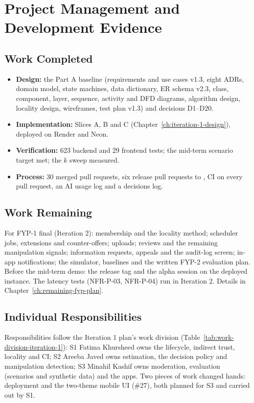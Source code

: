 \chapter{Project Management and Development Evidence}\label{ch:project-management-development}
\section{Work Completed}\label{sec:work-completed}
\begin{itemize}
\item \textbf{Design:} the Part A baseline (requirements and use cases v1.3, eight ADRs, domain model, state machines, data dictionary, ER schema v2.3, class, component, layer, sequence, activity and DFD diagrams, algorithm design, locality design, wireframes, test plan v1.3) and decisions D1--D20.
\item \textbf{Implementation:} Slices A, B and C (Chapter~\ref{ch:iteration-1-design}), deployed on Render and Neon.
\item \textbf{Verification:} 623 backend and 29 frontend tests; the mid-term scenario target met; the $k$ sweep measured.
\item \textbf{Process:} 30 merged pull requests, six release pull requests to , CI on every pull request, an AI usage log and a decisions log.
\end{itemize}

\section{Work Remaining}\label{sec:work-remaining}
For FYP-1 final (Iteration 2): membership and the locality method; scheduler jobs, extensions and counter-offers; uploads; reviews and the remaining manipulation signals; information requests, appeals and the audit-log screen; in-app notifications; the simulator, baselines and the written FYP-2 evaluation plan. Before the mid-term demo: the release tag and the alpha session on the deployed instance. The latency tests (NFR-P-03, NFR-P-04) run in Iteration 2. Details in Chapter~\ref{ch:remaining-fyp-plan}.

\section{Individual Responsibilities}\label{sec:individual-responsibilities}
Responsibilities follow the Iteration 1 plan's work division (Table~\ref{tab:work-division-iteration-1}): S1 Fatima Khursheed owns the lifecycle, indirect trust, locality and CI; S2 Areeba Javed owns estimation, the decision policy and manipulation detection; S3 Minahil Kashif owns moderation, evaluation (scenarios and synthetic data) and the apps. Two pieces of work changed hands: deployment and the two-theme mobile UI (\#27), both planned for S3 and carried out by S1.

